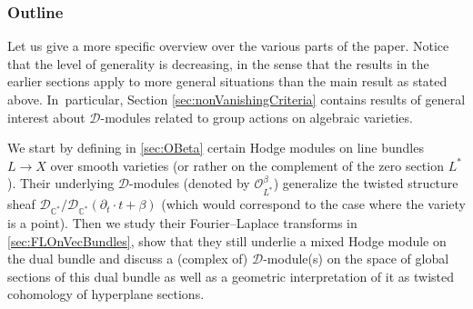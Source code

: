 \documentclass[JEP,XML,SOM,Unicode,published]{cedram}
\let\mathds\mathbb
\newcommand{\dC}{{\mathds C}}\let\C\dC
\newcommand{\cD}{\mathscr{D}}
\newcommand{\cO}{\mathcal{O}}\let\O\cO
\begin{document}
\subsubsection*{Outline}
Let us give a more specific overview over the various parts of the paper. Notice that the level of generality is decreasing, in the sense that the results in the earlier sections apply to more general situations than the main result as stated above. In~particular, Section \ref{sec:nonVanishingCriteria}
contains results of general interest about
$\cD$\nobreakdash-mod\-ules related to group actions on algebraic varieties.

We start by defining in \cref{sec:OBeta} certain Hodge modules on
line bundles \hbox{$L\!\to\! X$} over smooth varieties
(or rather on the complement of the zero section $L^*$). Their underlying $\mathscr{D}$\nobreakdash-mod\-ules (denoted by $\cO_{L^*}^\beta$) generalize the twisted structure sheaf \hbox{$\mathscr{D}_{\dC^*}/\mathscr{D}_{\dC^*}(\partial_t\cdot t + \beta)$}
(which would correspond to the case where the variety is a point).
Then we study their Fourier--Laplace transforms in \cref{sec:FLOnVecBundles}, show that they still underlie a mixed Hodge module on the dual bundle and discuss a (complex of) $\cD$\nobreakdash-mod\-ule(s) on the space of global sections of this dual bundle as well as a geometric interpretation of it as twisted cohomology of hyperplane sections.
\end{document}

